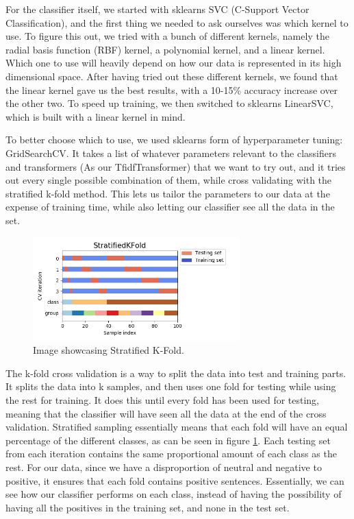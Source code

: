 For the classifier itself, we started with sklearns SVC\cite{svc} (C-Support Vector Classification), and the first thing we needed to ask ourselves was which kernel to use. To figure this out, we tried with a bunch of different kernels, namely the radial basis function (RBF\cite{rbf}) kernel, a polynomial kernel\cite{poly}, and a linear kernel\cite{linear}. Which one to use will heavily depend on how our data is represented in its high dimensional space. 
After having tried out these different kernels, we found that the linear kernel gave us the best results, with a 10-15\% accuracy increase over the other two. To speed up training, we then switched to sklearns LinearSVC, which is built with a linear kernel in mind.

To better choose which to use, we used sklearns form of hyperparameter tuning: GridSearchCV. It takes a list of whatever parameters relevant to the classifiers and transformers (As our TfidfTransformer) that we want to try out, and it tries out every single possible combination of them, while cross validating with the stratified k-fold method. This lets us tailor the parameters to our data at the expense of training time, while also letting our classifier see all the data in the set.

\begin{figure}[H]
    \includegraphics[width=8cm]{Images/StratifiedKFoldExplanation}
    \centering
    \caption{Image showcasing Stratified K-Fold.\cite{stratifiedkfold}}
    \label{StratifiedKfold}
\end{figure}

The k-fold cross validation is a way to split the data into test and training parts. It splits the data into k samples, and then uses one fold for testing while using the rest for training. It does this until every fold has been used for testing, meaning that the classifier will have seen all the data at the end of the cross validation.
Stratified sampling essentially means that each fold will have an equal percentage of the different classes, as can be seen in figure \ref{StratifiedKfold}. Each testing set from each iteration contains the same proportional amount of each class as the rest. For our data, since we have a disproportion of neutral and negative to positive, it ensures that each fold contains positive sentences. Essentially, we can see how our classifier performs on each class, instead of having the possibility of having all the positives in the training set, and none in the test set.

